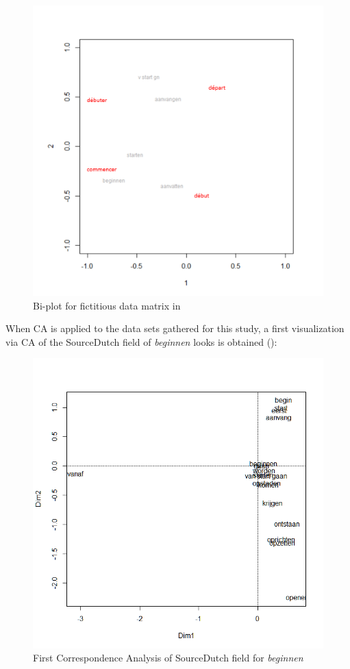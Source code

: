 \begin{figure}
\includegraphics[height=.3\textheight]{figures/Vandevoorde2-img18.png}
\caption{\label{fig:key:18}  Bi-plot for fictitious data matrix in }
\end{figure}


When CA is applied to the data sets gathered for this study, a first visualization via CA of the SourceDutch field of \textit{beginnen} looks is obtained ():


\begin{figure}
\includegraphics[height=.3\textheight]{figures/Vandevoorde2-img19.png}
\caption{\label{fig:key:19}  First Correspondence Analysis of SourceDutch field for \textit{beginnen}}
\end{figure}


